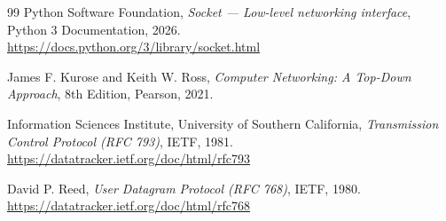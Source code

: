 \documentclass[a4paper,12pt]{article}
\begin{document}
	\newpage
	\begin{thebibliography}{99}
		Python Software Foundation, 
		\textit{Socket --- Low-level networking interface}, Python 3 Documentation, 2026.\\
		\url{https://docs.python.org/3/library/socket.html}
		
		James F. Kurose and Keith W. Ross, 
		\textit{Computer Networking: A Top-Down Approach}, 8th Edition, Pearson, 2021.
		
		Information Sciences Institute, University of Southern California, 
		\textit{Transmission Control Protocol (RFC 793)}, IETF, 1981.\\
		\url{https://datatracker.ietf.org/doc/html/rfc793}
		
		David P. Reed, 
		\textit{User Datagram Protocol (RFC 768)}, IETF, 1980.\\
		\url{https://datatracker.ietf.org/doc/html/rfc768}
	\end{thebibliography}
	
\end{document}
